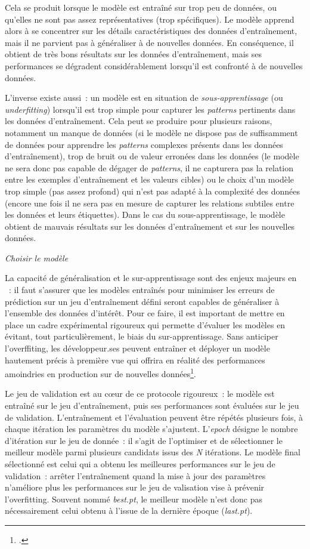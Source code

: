 Cela se produit lorsque le modèle est entraîné sur trop peu de données,
ou qu'elles ne sont pas assez représentatives (trop spécifiques). Le
modèle apprend alors à se concentrer sur les détails caractéristiques
des données d'entraînement, mais il ne parvient pas à généraliser à de
nouvelles données. En conséquence, il obtient de très bons résultats sur
les données d'entraînement, mais ses performances se dégradent
considérablement lorsqu'il est confronté à de nouvelles données.

L'inverse existe aussi~: un modèle est en situation de
\emph{sous-apprentissage} (ou \emph{underfitting}) lorsqu'il est trop
simple pour capturer les \textit{patterns} pertinents dans les données
d'entraînement. Cela peut se produire pour plusieurs raisons, notamment
un manque de données (si le modèle ne dispose pas de suffisamment de
données pour apprendre les \textit{patterns} complexes présents dans les données
d'entraînement), trop de bruit ou de valeur erronées dans les données
(le modèle ne sera donc pas capable de dégager de \textit{patterns}, il ne
capturera pas la relation entre les exemples d'entraînement et les
valeurs cibles) ou le choix d'un modèle trop simple (pas assez profond)
qui n'est pas adapté à la complexité des données (encore une fois il ne
sera pas en mesure de capturer les relations subtiles entre les données
et leurs étiquettes). Dans le cas du sous-apprentissage, le modèle
obtient de mauvais résultats sur les données d'entraînement et sur les
nouvelles données.

\emph{Choisir le modèle}

La capacité de généralisation et le sur-apprentissage sont des enjeux
majeurs en \ml~: il faut s'assurer que les modèles
entraînés pour minimiser les erreurs de prédiction sur un jeu
d'entraînement défini seront capables de généraliser à l'ensemble des
données d'intérêt. Pour ce faire, il est important de mettre en place un
cadre expérimental rigoureux qui permette d'évaluer les modèles en
évitant, tout particulièrement, le biais du sur-apprentissage. Sans
anticiper l'overffiting, les développeur.ses peuvent entraîner et déployer
un modèle hautement précis à première vue qui offrira en réalité des
performances amoindries en production sur de nouvelles
données\footcite[p.32]{azencott_introduction_2022}.

Le jeu de validation est au cœur de ce protocole rigoureux~: le
modèle est entraîné sur le jeu d'entraînement, puis ses performances
sont évaluées sur le jeu de validation. L'entraînement et l'évaluation
peuvent être répétés plusieurs fois, à chaque itération les paramètres du
modèle s'ajustent. L'\emph{epoch} désigne le nombre d'itération sur le
jeu de donnée~: il s'agit de l'optimiser et de sélectionner le meilleur
modèle parmi plusieurs candidats issus des \emph{N} itérations. Le
modèle final sélectionné est celui qui a obtenu les meilleures
performances sur le jeu de validation~: arrêter l'entraînement quand la
mise à jour des paramètres n'améliore plus les performances sur le jeu
de valisation vise à prévenir l'overfitting. Souvent nommé
\emph{best.pt}, le meilleur modèle n'est donc pas nécessairement celui
obtenu à l'issue de la dernière époque (\emph{last.pt}).

